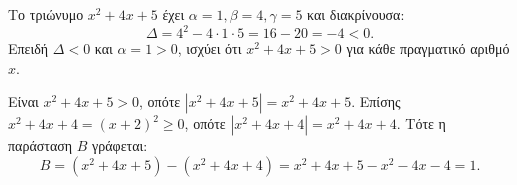 
\begin{alist}
\item Το τριώνυμο $x^2 + 4x + 5$ έχει $\alpha = 1, \beta = 4, \gamma = 5$ και διακρίνουσα:
\[\Delta = 4^2 - 4 \cdot 1 \cdot 5 = 16 - 20 = -4 < 0.\]
Επειδή $\Delta < 0$ και $\alpha = 1 > 0$, ισχύει ότι $x^2 + 4x + 5 > 0$ για κάθε πραγματικό αριθμό $x$.

\item Είναι $x^2 + 4x + 5 > 0$, οπότε $|x^2 + 4x + 5| = x^2 + 4x + 5$.
Επίσης $x^2 + 4x + 4 = (x + 2)^2 \ge 0$, οπότε $|x^2 + 4x + 4| = x^2 + 4x + 4$.
Τότε η παράσταση $B$ γράφεται:
\[B = (x^2 + 4x + 5) - (x^2 + 4x + 4) = x^2 + 4x + 5 - x^2 - 4x - 4 = 1.\]
\end{alist}

